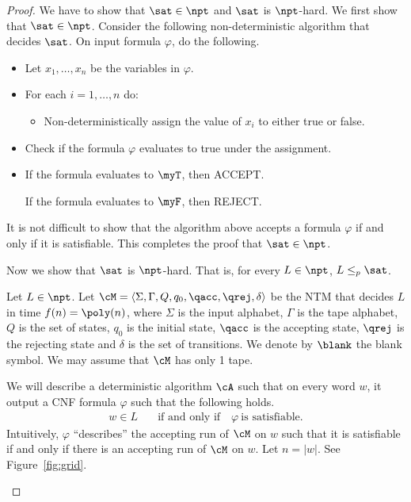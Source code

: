 \documentclass[11pt, a4paper]{article}
\begin{document}
\begin{proof}
We have to show that $\sat \in \npt$ and $\sat$ is $\npt$-hard.
We first show that $\sat\in\npt$.
Consider the following non-deterministic algorithm that decides $\sat$.
On input formula $\varphi$, do the following.
\begin{itemize}\itemsep=0pt
\item
Let $x_1,\ldots,x_n$ be the variables in $\varphi$.
\item
For each $i=1,\ldots,n$ do:
\begin{itemize}\itemsep=0pt
\item
Non-deterministically assign the value of $x_i$ to either true or false.
\end{itemize}
\item
Check if the formula $\varphi$ evaluates to true under the assignment.
\item
If the formula evaluates to $\myT$, then ACCEPT.

If the formula evaluates to $\myF$, then REJECT.
\end{itemize}
It is not difficult to show that the algorithm above accepts a formula $\varphi$
if and only if it is satisfiable.
This completes the proof that $\sat \in \npt$.

Now we show that $\sat$ is $\npt$-hard.
That is, for every $L \in \npt$, $L \leq_p \sat$.

Let $L\in \npt$.
Let $\cM=\langle \Sigma,\Gamma,Q,q_0,\qacc,\qrej,\delta\rangle$ 
be the NTM that decides $L$ in time $f(n)=\poly(n)$,
where $\Sigma$ is the input alphabet, $\Gamma$ is the tape alphabet,
$Q$ is the set of states, $q_0$ is the initial state,
$\qacc$ is the accepting state,
$\qrej$ is the rejecting state
and $\delta$ is the set of transitions.
We denote by $\blank$ the blank symbol.
We may assume that $\cM$ has only 1 tape.

We will describe a deterministic algorithm $\cA$ such that
on every word $w$, it output a CNF formula $\varphi$ such that the following holds.
\begin{align*}
w\in L & \quad \text{if and only if}\quad \varphi \ \text{is satisfiable.}
\end{align*} 
Intuitively, $\varphi$ ``describes'' the accepting run of $\cM$ on $w$
such that it is satisfiable if and only if there is an accepting run of $\cM$ on $w$.
Let $n=|w|$. See Figure~\ref{fig:grid}.


\begin{figure}


\begin{tikzpicture}


\end{tikzpicture}
\end{figure}
\end{proof}
\end{document}
